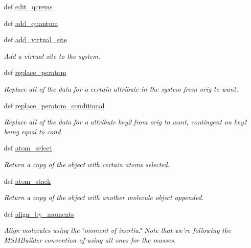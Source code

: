 \begin{DoxyCompactItemize}
def \hyperlink{classforcebalance_1_1molecule_1_1Molecule_a441d8367806c9a802bd0693fea16c62a}{edit\-\_\-qcrems}
\item 
def \hyperlink{classforcebalance_1_1molecule_1_1Molecule_a33020ff5e5cec23a3d9d1fe7adfa8583}{add\-\_\-quantum}
\item 
def \hyperlink{classforcebalance_1_1molecule_1_1Molecule_a13d86eb62139bdc2a835756cacb3be66}{add\-\_\-virtual\-\_\-site}
\begin{DoxyCompactList}\small\item\em Add a virtual site to the system. \end{DoxyCompactList}\item 
def \hyperlink{classforcebalance_1_1molecule_1_1Molecule_ad825186bec1659fdad2521a1b377323b}{replace\-\_\-peratom}
\begin{DoxyCompactList}\small\item\em Replace all of the data for a certain attribute in the system from orig to want. \end{DoxyCompactList}\item 
def \hyperlink{classforcebalance_1_1molecule_1_1Molecule_ae565eb57c2ee21f2be19b9761754aba5}{replace\-\_\-peratom\-\_\-conditional}
\begin{DoxyCompactList}\small\item\em Replace all of the data for a attribute key2 from orig to want, contingent on key1 being equal to cond. \end{DoxyCompactList}\item 
def \hyperlink{classforcebalance_1_1molecule_1_1Molecule_a432affdec68562b5b19fd249124480c3}{atom\-\_\-select}
\begin{DoxyCompactList}\small\item\em Return a copy of the object with certain atoms selected. \end{DoxyCompactList}\item 
def \hyperlink{classforcebalance_1_1molecule_1_1Molecule_a63dd7bc0347cc3dec5e8fa0ebfd567ec}{atom\-\_\-stack}
\begin{DoxyCompactList}\small\item\em Return a copy of the object with another molecule object appended. \end{DoxyCompactList}\item 
def \hyperlink{classforcebalance_1_1molecule_1_1Molecule_a685c8092020a46cd7cf5b52ab45ca6e4}{align\-\_\-by\-\_\-moments}
\begin{DoxyCompactList}\small\item\em Align molecules using the \char`\"{}moment of inertia.\char`\"{} Note that we're following the M\-S\-M\-Builder convention of using all ones for the masses. \end{DoxyCompactList}\item 

\end{DoxyCompactItemize}
